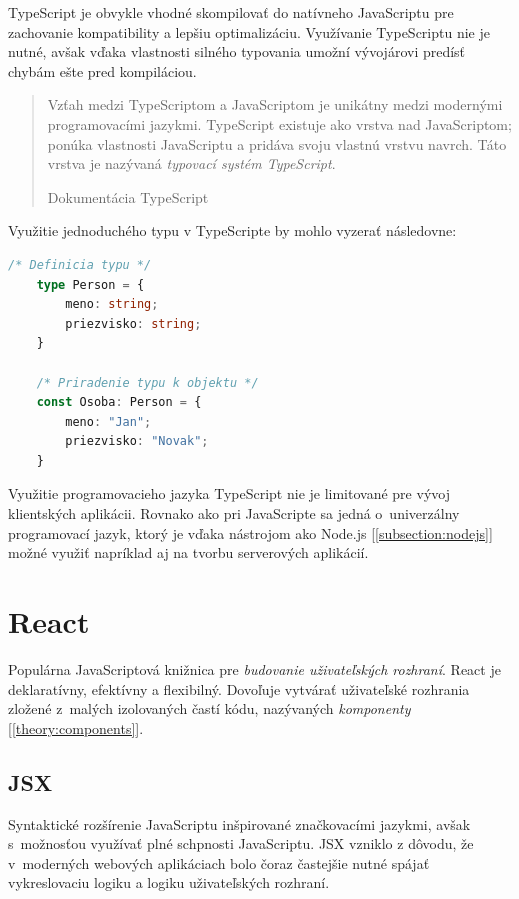 TypeScript je obvykle vhodné skompilovať do natívneho JavaScriptu pre zachovanie kompatibility a lepšiu optimalizáciu. Využívanie TypeScriptu nie je nutné, avšak vďaka vlastnosti silného typovania umožní vývojárovi predísť chybám ešte pred kompiláciou.

\blockquote[Dokumentácia TypeScript \cite{TSWeb}]{Vzťah medzi TypeScriptom a JavaScriptom je unikátny medzi modernými programovacími jazykmi. TypeScript existuje ako vrstva nad JavaScriptom; ponúka vlastnosti JavaScriptu a pridáva svoju vlastnú vrstvu navrch. Táto vrstva je nazývaná \emph{typovací systém TypeScript}.}

\noindent Využitie jednoduchého typu v TypeScripte by mohlo vyzerať následovne: \\

\begin{lstlisting}[language=TypeScript, caption=Príklad zápisu v~programovacom jazyku TypeScript.]
	/* Definicia typu */
	type Person = {
		meno: string;
		priezvisko: string;
	}

	/* Priradenie typu k objektu */
	const Osoba: Person = {
		meno: "Jan";
		priezvisko: "Novak";
	}
\end{lstlisting}

\bigskip

\noindent Využitie programovacieho jazyka TypeScript nie je limitované pre vývoj klientských aplikácii. Rovnako ako pri JavaScripte sa jedná o~univerzálny programovací jazyk, ktorý je vďaka nástrojom ako Node.js [\ref{subsection:nodejs}] možné využiť napríklad aj na tvorbu serverových aplikácií.

\section{React}
\label{theory:react}
Populárna JavaScriptová knižnica pre \emph{budovanie uživateľských rozhraní}. React je deklaratívny, efektívny a flexibilný. Dovoľuje vytvárať uživateľské rozhrania zložené z~malých izolovaných častí kódu, nazývaných \emph{komponenty} [\ref{theory:components}]. \cite{React}

\subsection{JSX}
Syntaktické rozšírenie JavaScriptu inšpirované značkovacími jazykmi, avšak s~možnosťou využívať plné schpnosti JavaScriptu. JSX vzniklo z dôvodu, že v~moderných webových aplikáciach bolo čoraz častejšie nutné spájať vykreslovaciu logiku a logiku uživateľských rozhraní. \cite{React} \\

